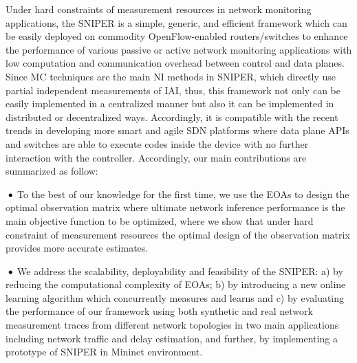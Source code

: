 
Under hard constraints of measurement resources in network monitoring applications, the SNIPER is a simple, generic, and efficient framework which can be easily deployed on commodity OpenFlow-enabled routers/switches to enhance the performance of various passive or active network monitoring applications with low computation and communication overhead between control and data planes. Since MC techniques are the main NI methods in SNIPER, which directly use partial independent measurements of IAI, thus, this framework not only can be easily implemented in a centralized manner but also it can be implemented in distributed or decentralized ways. Accordingly, it is compatible with the recent trends in developing more smart and agile SDN platforms \cite{Bianchi:2014}\cite{Moshref:2014} where data plane APIs and switches are able to execute codes inside the device with no further interaction with the controller. Accordingly, our main contributions are summarized as follow:

\textbf{$\text{\hspace{0.1cm}}\bullet$} To the best of our knowledge for the first time, we use the EOAs to design the optimal observation matrix where ultimate network inference performance is the main objective function to be optimized, where we show that under hard constraint of measurement resources the optimal design of the observation matrix provides more accurate estimates.

\textbf{$\text{\hspace{0.1cm}}\bullet$} We address the scalability, deployability and feasibility of the SNIPER: a) by reducing the computational complexity of EOAs; b) by introducing a new online learning algorithm which concurrently measures and learns and c) by evaluating the performance of our framework using both synthetic and real network measurement traces from different network topologies in two main applications including network traffic and delay estimation, and further, by implementing a prototype of SNIPER in Mininet environment.


